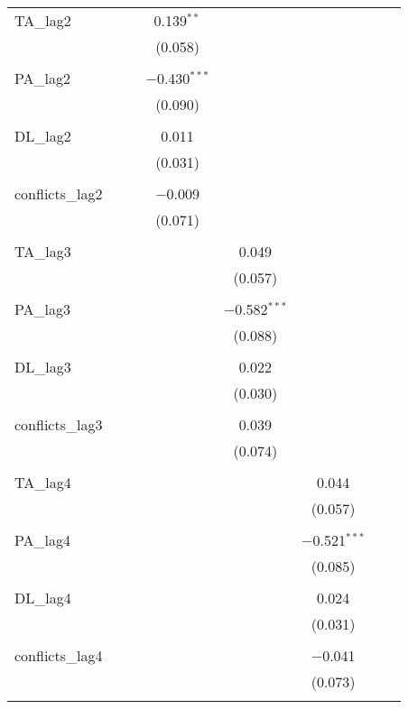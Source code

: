 \begin{table}[!htbp]
\begin{tabular}{@{\extracolsep{5pt}}lccccccc}
 TA\_lag2 &  &  & 0.139$^{**}$ &  &  &  &  \\ 
  &  &  & (0.058) &  &  &  &  \\ 
  & & & & & & & \\ 
 PA\_lag2 &  &  & $-$0.430$^{***}$ &  &  &  &  \\ 
  &  &  & (0.090) &  &  &  &  \\ 
  & & & & & & & \\ 
 DL\_lag2 &  &  & 0.011 &  &  &  &  \\ 
  &  &  & (0.031) &  &  &  &  \\ 
  & & & & & & & \\ 
 conflicts\_lag2 &  &  & $-$0.009 &  &  &  &  \\ 
  &  &  & (0.071) &  &  &  &  \\ 
  & & & & & & & \\ 
 TA\_lag3 &  &  &  & 0.049 &  &  &  \\ 
  &  &  &  & (0.057) &  &  &  \\ 
  & & & & & & & \\ 
 PA\_lag3 &  &  &  & $-$0.582$^{***}$ &  &  &  \\ 
  &  &  &  & (0.088) &  &  &  \\ 
  & & & & & & & \\ 
 DL\_lag3 &  &  &  & 0.022 &  &  &  \\ 
  &  &  &  & (0.030) &  &  &  \\ 
  & & & & & & & \\ 
 conflicts\_lag3 &  &  &  & 0.039 &  &  &  \\ 
  &  &  &  & (0.074) &  &  &  \\ 
  & & & & & & & \\ 
 TA\_lag4 &  &  &  &  & 0.044 &  &  \\ 
  &  &  &  &  & (0.057) &  &  \\ 
  & & & & & & & \\ 
 PA\_lag4 &  &  &  &  & $-$0.521$^{***}$ &  &  \\ 
  &  &  &  &  & (0.085) &  &  \\ 
  & & & & & & & \\ 
 DL\_lag4 &  &  &  &  & 0.024 &  &  \\ 
  &  &  &  &  & (0.031) &  &  \\ 
  & & & & & & & \\ 
 conflicts\_lag4 &  &  &  &  & $-$0.041 &  &  \\ 
  &  &  &  &  & (0.073) &  &  \\ 
  & & & & & & & \\ 

\end{tabular}
\end{table}
